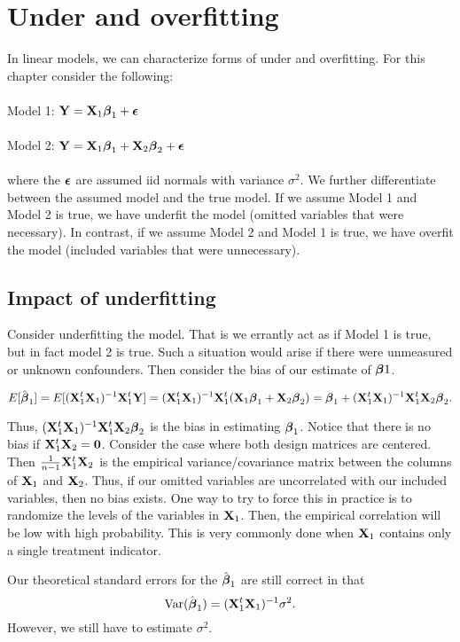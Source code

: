 \chapter{Under and overfitting}

In linear models, we can characterize forms of under and overfitting. For this chapter consider the following: \\ \ \\
\noindent
Model 1: $\mathbf{Y} = \mathbf{X}_1 \boldsymbol{\beta}_1 + \boldsymbol{\epsilon}$ \\ \ \\ 
\noindent
Model 2: $\mathbf{Y} = \mathbf{X}_1 \boldsymbol{\beta}_1 + \mathbf{X}_2 \boldsymbol{\beta}_2 + \boldsymbol{\epsilon}$ \\ \ \\
where the $\boldsymbol{\epsilon}$ are assumed iid normals with variance $\sigma^2$. 
We further differentiate between the assumed model and the true model. 
If we assume Model 1 and Model 2 is true, we have underfit the model (omitted variables that were necessary). 
In contrast, if we assume Model 2 and Model 1 is true, we have overfit the model (included variables that were
unnecessary). 

\section{Impact of underfitting}
Consider underfitting the model. That is we errantly act as if Model 1 is true, but in fact model 2 is true.
Such a situation would arise if there were unmeasured or unknown confounders. Then consider the
bias of our estimate of $\boldsymbol{\beta}1$. 

$$
E[\hat {\boldsymbol{\beta}}_1] = E[(\mathbf{X}_1^t \mathbf{X}_1)^{-1} \mathbf{X}_1^t \mathbf{Y}]
= (\mathbf{X}_1^t \mathbf{X}_1)^{-1} \mathbf{X}_1^t (\mathbf{X}_1 \boldsymbol{\beta}_1 + \mathbf{X}_2 \boldsymbol{\beta}_2)
= \boldsymbol{\beta}_1 + (\mathbf{X}_1^t \mathbf{X}_1)^{-1} \mathbf{X}_1^t \mathbf{X}_2 \boldsymbol{\beta}_2.
$$

Thus, $(\mathbf{X}_1^t \mathbf{X}_1)^{-1} \mathbf{X}_1^t \mathbf{X}_2 \boldsymbol{\beta}_2$ is the bias in estimating $\boldsymbol{\beta}_1$. Notice
that there is no bias if $\mathbf{X}_1^t \mathbf{X}_2 = \mathbf{0}$. Consider the case where both design matrices
are centered. Then $\frac{1}{n-1}\mathbf{X}_1^t \mathbf{X}_2$ is the empirical 
variance/covariance matrix between the columns of $\mathbf{X}_1$ and $\mathbf{X}_2$. Thus, if our omitted
variables are uncorrelated with our included variables, then no bias exists. One way
to try to force this in practice is to randomize the levels of the variables in $\mathbf{X}_1$.
Then, the empirical correlation will be low with high probability. This is very commonly
done when $\mathbf{X}_1$ contains only a single treatment indicator.

Our theoretical standard errors for the $\hat {\boldsymbol{\beta}}_1$ are still correct in that
$$
\mbox{Var}(\hat {\boldsymbol{\beta}}_1) = (\mathbf{X}_1^t \mathbf{X}_1)^{-1} \sigma^2.
$$
However, we still have to estimate $\sigma^2$. 

